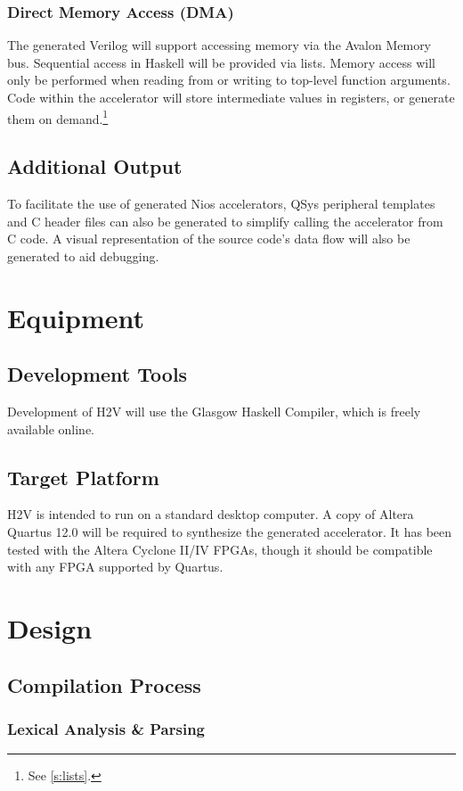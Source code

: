 \documentclass[english,onecolumn]{article}
\begin{document}
\subsubsection{Direct Memory Access (DMA)}
\label{s:DMA}
The generated Verilog will support accessing memory via the Avalon Memory bus. Sequential access in Haskell will be provided via lists.
Memory access will only be performed when reading from or writing to top-level function arguments. Code within the accelerator will store intermediate values in registers, or generate them on demand.\footnote{See \ref{s:lists}.}

\subsection{Additional Output}
To facilitate the use of generated Nios accelerators, QSys peripheral templates and C header files can also be generated to simplify calling the accelerator from C code.
A visual representation of the source code's data flow will also be generated to aid debugging.

\section{Equipment}
\subsection{Development Tools}
Development of H2V will use the Glasgow Haskell Compiler, which is freely available online.

\subsection{Target Platform}
H2V is intended to run on a standard desktop computer. A copy of Altera Quartus 12.0 will be required to synthesize the generated accelerator. It has been tested with the Altera Cyclone II/IV FPGAs, though it should be compatible with any FPGA supported by Quartus.

\section{Design}
\subsection{Compilation Process}
\subsubsection{Lexical Analysis \& Parsing}
\end{document}
